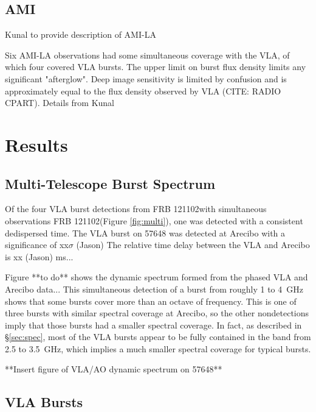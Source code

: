 \documentclass[twocolumn]{aastex61}
\newcommand{\frb}{FRB 121102}
\begin{document}
\subsection{AMI}

{\color{red} Kunal to provide description of AMI-LA}

Six AMI-LA observations had some simultaneous coverage with the VLA, of which four covered VLA bursts. The upper limit on burst flux density limits any significant "afterglow". Deep image sensitivity is limited by confusion and is approximately equal to the flux density observed by VLA (CITE: RADIO CPART). {\color{red} Details from Kunal}

\section{Results}

\subsection{Multi-Telescope Burst Spectrum}
Of the four VLA burst detections from \frb with simultaneous observations \frb (Figure \ref{fig:multi}), one was detected with a consistent dedispersed time. The VLA burst on 57648 was detected at Arecibo with a significance of {\color{red} xx$\sigma$ (Jason)} The relative time delay between the VLA and Arecibo is {\color{red} xx (Jason)} ms...

Figure **to do** shows the dynamic spectrum formed from the phased VLA and Arecibo data... 
This simultaneous detection of a burst from roughly 1 to 4~GHz shows that some bursts cover more than an octave of frequency. This is one of three bursts with similar spectral coverage at Arecibo, so the other nondetections imply that those bursts had a smaller spectral coverage. In fact, as described in \S \ref{sec:spec}, most of the VLA bursts appear to be fully contained in the band from 2.5 to 3.5~GHz, which implies a much smaller spectral coverage for typical bursts.

**Insert figure of VLA/AO dynamic spectrum on 57648**


\subsection{VLA Bursts}
\end{document}
